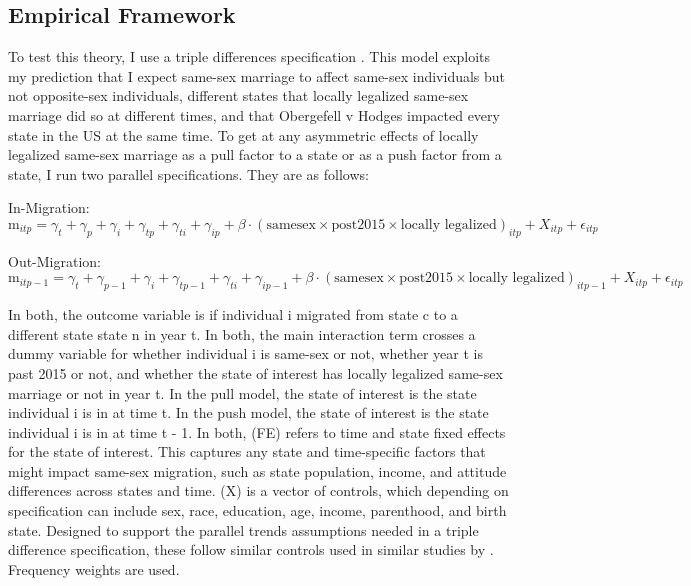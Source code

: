 \documentclass[12pt,letterpaper]{article}
\begin{document}
\subsection{Empirical Framework}

To test this theory, I use a triple differences specification \citep{23, 24, 25}. This model exploits my prediction that I expect same-sex marriage to affect same-sex individuals but not opposite-sex individuals, different states that locally legalized same-sex marriage did so at different times, and that Obergefell v Hodges impacted every state in the US at the same time. To get at any asymmetric effects of locally legalized same-sex marriage as a pull factor to a state or as a push factor from a state, I run two parallel specifications. They are as follows:

In-Migration:
\begin{equation}
\text{m}_{itp} = \gamma_t + \gamma_p + \gamma_i + \gamma_{tp} + \gamma_{ti} + \gamma_{ip} + \beta \cdot (\text{samesex} \times \text{post2015} \times \text{locally legalized})_{itp} 
+ X_{itp} + \epsilon_{itp}
\end{equation}

Out-Migration:
\begin{equation}
\text{m}_{itp-1} = \gamma_t + \gamma_{p-1} + \gamma_i + \gamma_{tp-1} + \gamma_{ti} + \gamma_{ip-1} + \beta \cdot (\text{samesex} \times \text{post2015} \times \text{locally legalized})_{itp-1} 
+ X_{itp} + \epsilon_{itp}
\end{equation}

In both, the outcome variable is if individual i migrated from state c to a different state state n in year t. In both, the main interaction term crosses a dummy variable for whether individual i is same-sex or not, whether year t is past 2015 or not, and whether the state of interest has locally legalized same-sex marriage or not in year t. In the pull model, the state of interest is the state individual i is in at time t. In the push model, the state of interest is the state individual i is in at time t - 1. In both, (FE) refers to time and state fixed effects for the state of interest. This captures any state and time-specific factors that might impact same-sex migration, such as state population, income, and attitude differences across states and time. (X) is a vector of controls, which depending on specification can include sex, race, education, age, income, parenthood, and birth state. Designed to support the parallel trends assumptions needed in a triple difference specification, these follow similar controls used in similar studies by \citep{1, 3, 5, 7, 12}. Frequency weights are used.
\end{document}
